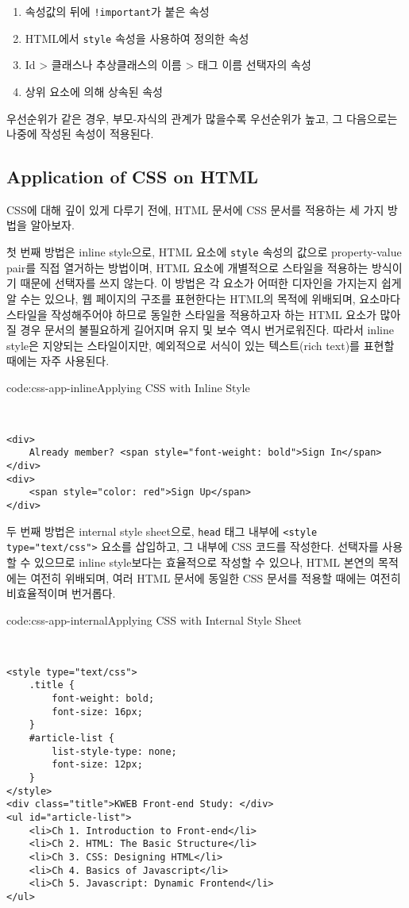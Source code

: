 \begin{enumerate}
    \item 속성값의 뒤에 \verb|!important|가 붙은 속성
    \item HTML에서 \verb|style| 속성을 사용하여 정의한 속성
    \item Id {\textgreater} 클래스나 추상클래스의 이름 {\textgreater} 태그 이름 선택자의 속성
    \item 상위 요소에 의해 상속된 속성
\end{enumerate}

우선순위가 같은 경우, 부모-자식의 관계가 많을수록 우선순위가 높고, 그 다음으로는 나중에 작성된 속성이 적용된다.

\subsection*{Application of CSS on HTML}
CSS에 대해 깊이 있게 다루기 전에, HTML 문서에 CSS 문서를 적용하는 세 가지 방법을 알아보자.

첫 번째 방법은 inline style으로, HTML 요소에 \verb|style| 속성의 값으로 property-value pair를 직접 열거하는 방법이며, HTML 요소에 개별적으로 스타일을 적용하는 방식이기 때문에 선택자를 쓰지 않는다. 이 방법은 각 요소가 어떠한 디자인을 가지는지 쉽게 알 수는 있으나, 웹 페이지의 구조를 표현한다는 HTML의 목적에 위배되며, 요소마다 스타일을 작성해주어야 하므로 동일한 스타일을 적용하고자 하는 HTML 요소가 많아질 경우 문서의 불필요하게 길어지며 유지 및 보수 역시 번거로워진다. 따라서 inline style은 지양되는 스타일이지만, 예외적으로 서식이 있는 텍스트(rich text)를 표현할 때에는 자주 사용된다.

\begin{codeenv}{code:css-app-inline}{Applying CSS with Inline Style}\begin{verbatim}


<div>
    Already member? <span style="font-weight: bold">Sign In</span>
</div>
<div>
    <span style="color: red">Sign Up</span>
</div>
\end{verbatim}
\end{codeenv}

두 번째 방법은 internal style sheet으로, \verb|head| 태그 내부에 \verb|<style type="text/css">| 요소를 삽입하고, 그 내부에 CSS 코드를 작성한다. 선택자를 사용할 수 있으므로 inline style보다는 효율적으로 작성할 수 있으나, HTML 본연의 목적에는 여전히 위배되며, 여러 HTML 문서에 동일한 CSS 문서를 적용할 때에는 여전히 비효율적이며 번거롭다.

\begin{codeenv}{code:css-app-internal}{Applying CSS with Internal Style Sheet}\begin{verbatim}


<style type="text/css">
    .title {
        font-weight: bold;
        font-size: 16px;
    }
    #article-list {
        list-style-type: none;
        font-size: 12px;
    }
</style>
<div class="title">KWEB Front-end Study: </div>
<ul id="article-list">
    <li>Ch 1. Introduction to Front-end</li>
    <li>Ch 2. HTML: The Basic Structure</li>
    <li>Ch 3. CSS: Designing HTML</li>
    <li>Ch 4. Basics of Javascript</li>
    <li>Ch 5. Javascript: Dynamic Frontend</li>
</ul>
\end{verbatim}
\end{codeenv}

